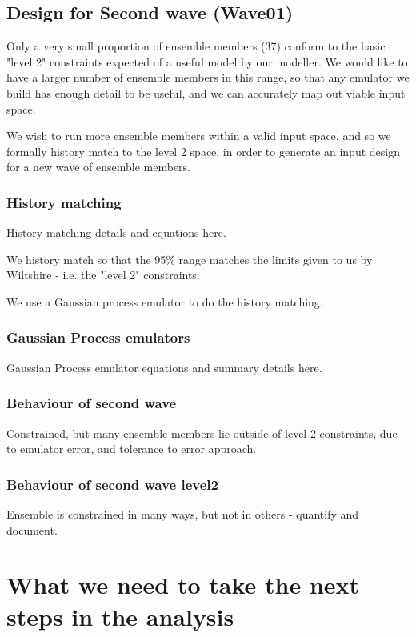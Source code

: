 \documentclass[gmd, manuscript]{copernicus}
\begin{document}
\subsection{Design for Second wave (Wave01)}

Only a very small proportion of ensemble members (37) conform to the basic "level 2" constraints expected of a useful model by our modeller. We would like to have a larger number of ensemble members in this range, so that any emulator we build has enough detail to be useful, and we can accurately map out viable input space.

We wish to run more ensemble members within a valid input space, and so we formally history match to the level 2 space, in order to generate an input design for a new wave of ensemble members.

\subsubsection{History matching}

History matching details and equations here.

We history match so that the 95\% range matches the limits given to us by Wiltshire - i.e. the "level 2" constraints. 

We use a Gaussian process emulator to do the history matching.

\subsubsection{Gaussian Process emulators} 

Gaussian Process emulator equations and summary details here.

\subsubsection{Behaviour of second wave}

Constrained, but many ensemble members lie outside of level 2 constraints, due to emulator error, and tolerance to error approach.

\subsubsection{Behaviour of second wave level2}

Ensemble is constrained in many ways, but not in others - quantify and document.

\section{What we need to take the next steps in the analysis}
\end{document}
